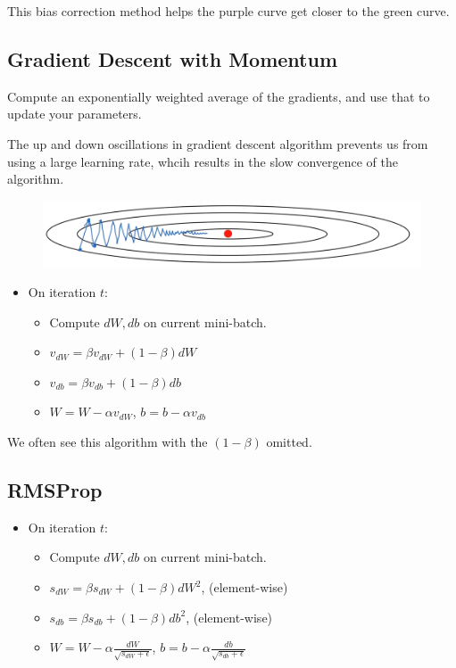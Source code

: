 This bias correction method helps the purple curve get closer to the green curve.

\subsection{Gradient Descent with Momentum}

Compute an exponentially weighted average of the gradients, and use that to update your parameters. 

The up and down oscillations in gradient descent algorithm prevents us from using a large learning rate, whcih results in the slow convergence of the algorithm. 
\begin{figure}[H]
    \includegraphics[scale=0.35]{images/GD.png}
    \centering
\end{figure}

\begin{itemize}
    \item On iteration $t$:
    \begin{itemize}
        \item[] Compute $dW, db$ on current mini-batch.
        \item[] $v_{dW} = \beta v_{dW} + (1-\beta)dW$
        \item[] $v_{db} = \beta v_{db} + (1-\beta)db$
        \item[] $W = W - \alpha v_{dW}$, $b = b - \alpha v_{db}$ 
    \end{itemize}
\end{itemize}

We often see this algorithm with the $(1-\beta)$ omitted. 

\subsection{RMSProp}

\begin{itemize} 
    \item On iteration $t$:
    \begin{itemize}
        \item[] Compute $dW, db$ on current mini-batch.
        \item[] $s_{dW} = \beta s_{dW} + (1-\beta)dW^2$, (element-wise)
        \item[] $s_{db} = \beta s_{db} + (1-\beta)db^2$, (element-wise)
        \item[] $W = W - \alpha \frac{dW}{\sqrt{s_{dW}+\epsilon}}$, $b = b - \alpha \frac{db}{\sqrt{s_{db}+\epsilon}}$ 
    \end{itemize}
\end{itemize}

